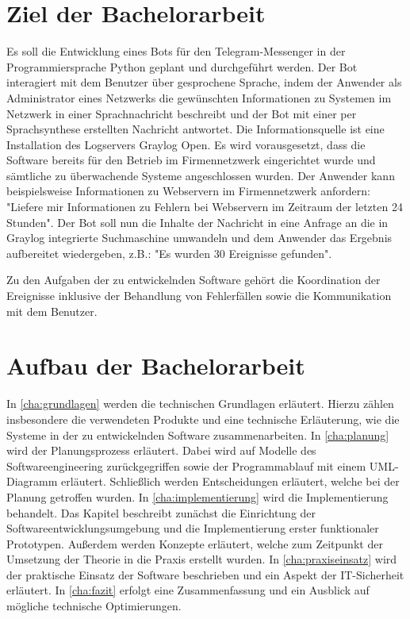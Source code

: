 \section{Ziel der Bachelorarbeit}

Es soll die Entwicklung eines Bots für den Telegram-Messenger in der Programmiersprache Python geplant und durchgeführt werden. Der Bot interagiert mit dem Benutzer über gesprochene Sprache, indem der Anwender als Administrator eines Netzwerks die gewünschten Informationen zu Systemen im Netzwerk in einer Sprachnachricht beschreibt und der Bot mit einer per Sprachsynthese erstellten Nachricht antwortet. Die Informationsquelle ist eine Installation des Logservers Graylog Open. Es wird vorausgesetzt, dass die Software bereits für den Betrieb im Firmennetzwerk eingerichtet wurde und sämtliche zu überwachende Systeme angeschlossen wurden. Der Anwender kann beispielsweise Informationen zu Webservern im Firmennetzwerk anfordern: "Liefere mir Informationen zu Fehlern bei Webservern im Zeitraum der letzten 24 Stunden". Der Bot soll nun die Inhalte der Nachricht in eine Anfrage an die in Graylog integrierte Suchmaschine umwandeln und dem Anwender das Ergebnis aufbereitet wiedergeben, z.B.: "Es wurden 30 Ereignisse gefunden". 

Zu den Aufgaben der zu entwickelnden Software gehört die Koordination der Ereignisse inklusive der Behandlung von Fehlerfällen sowie die Kommunikation mit dem Benutzer.

\section{Aufbau der Bachelorarbeit}

In \autoref{cha:grundlagen} werden die technischen Grundlagen erläutert. Hierzu zählen insbesondere die verwendeten Produkte und eine technische Erläuterung, wie die Systeme in der zu entwickelnden Software zusammenarbeiten. In \autoref{cha:planung} wird der Planungsprozess erläutert. Dabei wird auf Modelle des Softwareengineering zurückgegriffen sowie der Programmablauf mit einem UML-Diagramm erläutert. Schließlich werden Entscheidungen erläutert, welche bei der Planung getroffen wurden. In \autoref{cha:implementierung} wird die Implementierung behandelt. Das Kapitel beschreibt zunächst die Einrichtung der Softwareentwicklungsumgebung und die Implementierung erster funktionaler Prototypen. Außerdem werden Konzepte erläutert, welche zum Zeitpunkt der Umsetzung der Theorie in die Praxis erstellt wurden. In \autoref{cha:praxiseinsatz} wird der praktische Einsatz der Software beschrieben und ein Aspekt der IT-Sicherheit erläutert. In \autoref{cha:fazit} erfolgt eine Zusammenfassung und ein Ausblick auf mögliche technische Optimierungen.